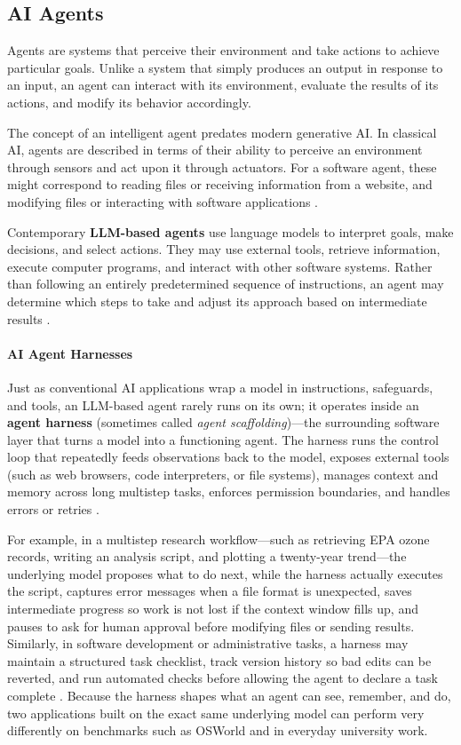 \documentclass[11pt]{article}
\begin{document}
\subsection{AI Agents}
Agents are systems that perceive their environment and take actions
to achieve particular goals. Unlike a system that simply produces
an output in response to an input, an agent can interact with its
environment, evaluate the results of its actions, and modify its
behavior accordingly.

The concept of an intelligent agent predates modern
generative AI. In classical AI, agents are described in
terms of their ability to perceive an environment through
sensors and act upon it through actuators. For a software
agent, these might correspond to reading files or receiving
information from a website, and modifying files or
interacting with software applications
\citep{RussellNorvig2021}.

Contemporary \textbf{LLM-based agents} use language models
to interpret goals, make decisions, and select actions.
They may use external tools, retrieve information, execute
computer programs, and interact with other software systems.
Rather than following an entirely predetermined sequence of
instructions, an agent may determine which steps to take
and adjust its approach based on intermediate results
\citep{Anthropic2024Agents}.

\paragraph{AI Agent Harnesses}
Just as conventional AI applications wrap a model in instructions,
safeguards, and tools, an LLM-based agent rarely runs on its own;
it operates inside an \textbf{agent harness} (sometimes called
\emph{agent scaffolding})---the surrounding software layer that turns
a model into a functioning agent.
The harness runs the control loop that repeatedly feeds observations back to the model, exposes external tools (such as web browsers, code interpreters, or file systems), manages context and memory across long multistep tasks, enforces permission boundaries, and handles errors or retries \citep{Anthropic2025Harnesses}.

For example, in a multistep research workflow---such as retrieving EPA ozone records, writing an analysis script, and plotting a twenty-year trend---the underlying model proposes what to do next, while the harness actually executes the script, captures error messages when a file format is unexpected, saves intermediate progress so work is not lost if the context window fills up, and pauses to ask for human approval before modifying files or sending results. Similarly, in software development or administrative tasks, a harness may maintain a structured task checklist, track version history so bad edits can be reverted, and run automated checks before allowing the agent to declare a task complete \citep{Anthropic2025Harnesses}. Because the harness shapes what an agent can see, remember, and do, two applications built on the exact same underlying model can perform very differently on benchmarks such as OSWorld and in everyday university work.
\end{document}
